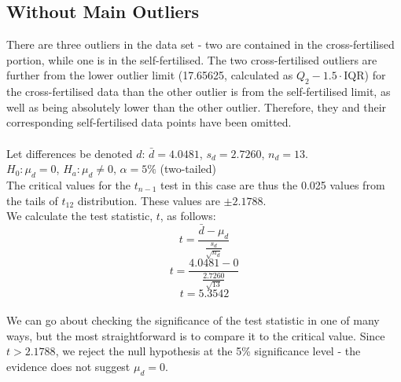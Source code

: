 \documentclass[]{article}
\begin{document}
\subsection{Without Main Outliers}
There are three outliers in the data set - two are contained in the cross-fertilised portion, while one is in the self-fertilised. The two cross-fertilised outliers are further from the lower outlier limit (17.65625, calculated as $Q_2 - 1.5\cdot$IQR) for the cross-fertilised data than the other outlier is from the self-fertilised limit, as well as being absolutely lower than the other outlier. Therefore, they and their corresponding self-fertilised data points have been omitted.
\\
\\
Let differences be denoted $d$: $\bar{d} = 4.0481$, $s_d = 2.7260$, $n_d = 13$.
\\
$H_0: \mu_d = 0$, $H_a: \mu_d \neq 0$, $\alpha = 5\%$ (two-tailed)
\\
The critical values for the $t_{n-1}$ test in this case are thus the 0.025 values from the tails of $t_{12}$ distribution. These values are $\pm 2.1788$.
\\
We calculate the test statistic, $t$, as follows:
$$t = \frac{\bar{d} - \mu_d}{\frac{s_d}{\sqrt{n_d}}}$$
$$t = \frac{4.0481 - 0}{\frac{2.7260}{\sqrt{13}}}$$
$$t = 5.3542$$
\\
We can go about checking the significance of the test statistic in one of many ways, but the most straightforward is to compare it to the critical value. Since $t > 2.1788$, we reject the null hypothesis at the 5\% significance level - the evidence does not suggest $\mu_d = 0$.
\end{document}
